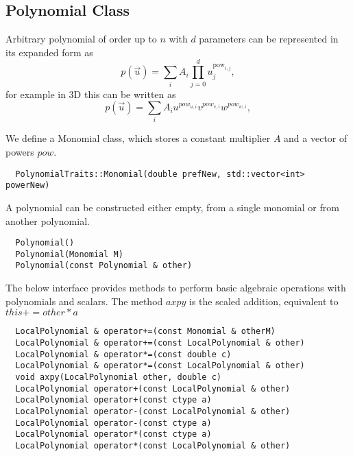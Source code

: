 \subsection{Polynomial Class}
\label{interface-geometry-polynomial}

\noindent
Arbitrary polynomial of order up to $n$ with $d$ parameters can be represented in its expanded form as
\[ p(\vec{u}) = \sum_i A_i \prod_{j = 0}^d u_j^{\mathrm{pow}_{i,j}},  \]
for example in 3D this can be written as
\[ p(\vec{u}) = \sum_i A_i u^{pow_{u,i}} v^{pow_{v,i}} w^{pow_{w, i}},  \]

\noindent
We define a Monomial class, which stores a constant multiplier $A$ and a vector of powers $pow$. \\

\begin{mybox}
\begin{lstlisting}
  PolynomialTraits::Monomial(double prefNew, std::vector<int> powerNew)
\end{lstlisting}
\end{mybox}

\noindent
A polynomial can be constructed either empty, from a single monomial or from another polynomial. \\

\begin{mybox}
\begin{lstlisting}
  Polynomial()
  Polynomial(Monomial M)
  Polynomial(const Polynomial & other)
\end{lstlisting}
\end{mybox}

\noindent
The below interface provides methods to perform basic algebraic operations with polynomials and scalars. The method $axpy$ is the scaled addition, equivalent to $this += other * a$ \\

\begin{mybox}
\begin{lstlisting}
  LocalPolynomial & operator+=(const Monomial & otherM)
  LocalPolynomial & operator+=(const LocalPolynomial & other)
  LocalPolynomial & operator*=(const double c)  
  LocalPolynomial & operator*=(const LocalPolynomial & other)  
  void axpy(LocalPolynomial other, double c)
  LocalPolynomial operator+(const LocalPolynomial & other)
  LocalPolynomial operator+(const ctype a)  
  LocalPolynomial operator-(const LocalPolynomial & other)  
  LocalPolynomial operator-(const ctype a)  
  LocalPolynomial operator*(const ctype a)  
  LocalPolynomial operator*(const LocalPolynomial & other)
\end{lstlisting}
\end{mybox}

